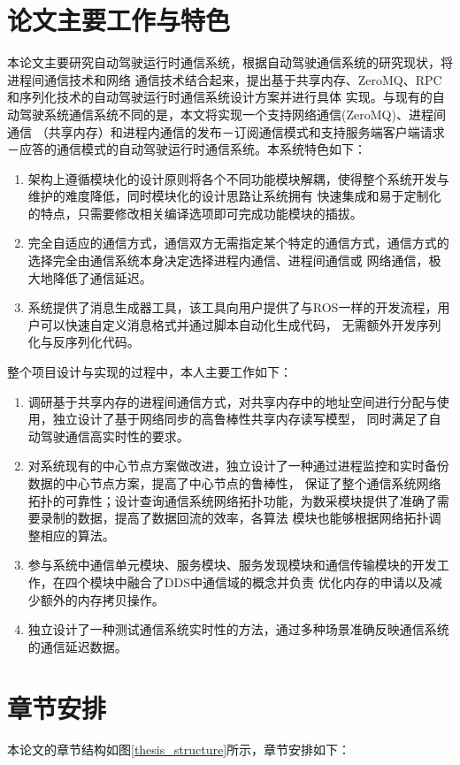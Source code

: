 \section{论文主要工作与特色}
本论文主要研究自动驾驶运行时通信系统，根据自动驾驶通信系统的研究现状，将进程间通信技术和网络
通信技术结合起来，提出基于共享内存、ZeroMQ、RPC和序列化技术的自动驾驶运行时通信系统设计方案并进行具体
实现。与现有的自动驾驶系统通信系统不同的是，本文将实现一个支持网络通信(ZeroMQ)、进程间通信
（共享内存）和进程内通信的发布－订阅通信模式和支持服务端客户端请求－应答的通信模式的自动驾驶运行时通信系统。本系统特色如下：
\begin{enumerate}
  \item 架构上遵循模块化的设计原则将各个不同功能模块解耦，使得整个系统开发与维护的难度降低，同时模块化的设计思路让系统拥有
  快速集成和易于定制化的特点，只需要修改相关编译选项即可完成功能模块的插拔。
  \item 完全自适应的通信方式，通信双方无需指定某个特定的通信方式，通信方式的选择完全由通信系统本身决定选择进程内通信、进程间通信或
  网络通信，极大地降低了通信延迟。
  \item 系统提供了消息生成器工具，该工具向用户提供了与ROS一样的开发流程，用户可以快速自定义消息格式并通过脚本自动化生成代码，
  无需额外开发序列化与反序列化代码。  
\end{enumerate}

整个项目设计与实现的过程中，本人主要工作如下：
\begin{enumerate}
  \item 调研基于共享内存的进程间通信方式，对共享内存中的地址空间进行分配与使用，独立设计了基于网络同步的高鲁棒性共享内存读写模型，
  同时满足了自动驾驶通信高实时性的要求。
  \item 对系统现有的中心节点方案做改进，独立设计了一种通过进程监控和实时备份数据的中心节点方案，提高了中心节点的鲁棒性，
  保证了整个通信系统网络拓扑的可靠性；设计查询通信系统网络拓扑功能，为数采模块提供了准确了需要录制的数据，提高了数据回流的效率，各算法
  模块也能够根据网络拓扑调整相应的算法。
  \item 参与系统中通信单元模块、服务模块、服务发现模块和通信传输模块的开发工作，在四个模块中融合了DDS中通信域的概念并负责
  优化内存的申请以及减少额外的内存拷贝操作。
  \item 独立设计了一种测试通信系统实时性的方法，通过多种场景准确反映通信系统的通信延迟数据。
\end{enumerate}

\section{章节安排}
本论文的章节结构如图\ref{thesis_structure}所示，章节安排如下：

